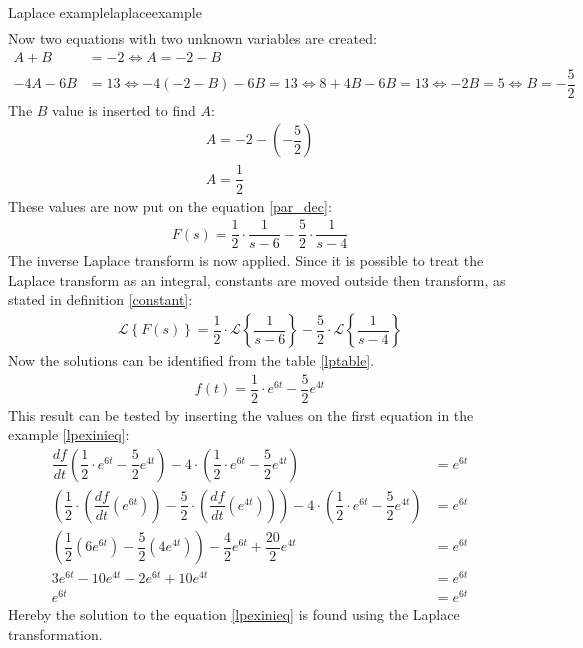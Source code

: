 \begin{example}{Laplace example}{laplaceexample}
\begin{align*}
\end{align*}
Now two equations with two unknown variables are created:
\begin{align*}
A+B &=-2 \Leftrightarrow A=-2-B \\
-4A-6B &=13 \Leftrightarrow -4(-2-B)-6B = 13 \Leftrightarrow 8 + 4B - 6B = 13 \Leftrightarrow -2B = 5 \Leftrightarrow B = -\dfrac{5}{2}
\end{align*}
The $B$ value is inserted to find $A$:
\begin{align*}
A=-2- \left(-\dfrac{5}{2} \right) \\
A=\dfrac{1}{2}
\end{align*}
These values are now put on the equation \eqref{par_dec}:
\begin{align*}
F(s) = \dfrac{1}{2} \cdot \dfrac{1}{s-6} - \dfrac{5}{2} \cdot \dfrac{1}{s-4}
\end{align*}
The inverse Laplace transform is now applied. Since it is possible to treat the Laplace transform as an integral, constants are moved outside then transform, as stated in definition \ref{constant}:
\begin{align*}
\mathcal{L} \left\{F(s) \right\} = \dfrac{1}{2} \cdot \mathcal{L} \left\{\dfrac{1}{s-6} \right\} - \dfrac{5}{2} \cdot \mathcal{L} \left\{\dfrac{1}{s-4} \right\}
\end{align*}
Now the solutions can be identified from the table \ref{lptable}.
\begin{align*}
f(t) = \dfrac{1}{2} \cdot e^{6t} - \dfrac{5}{2}e^{4t}
\end{align*}
This result can be tested by inserting the values on the first equation in the example \eqref{lpexinieq}:
\begin{align*}
\dfrac{df}{dt} \left(\dfrac{1}{2} \cdot e^{6t} - \dfrac{5}{2}e^{4t} \right) - 4 \cdot \left(\dfrac{1}{2} \cdot e^{6t} - \dfrac{5}{2}e^{4t} \right) &= e^{6t} \\
\left(\dfrac{1}{2} \cdot \left(\dfrac{df}{dt} \left(e^{6t} \right) \right) - \dfrac{5}{2} \cdot \left(\dfrac{df}{dt} \left(e^{4t} \right) \right) \right) - 4 \cdot \left(\dfrac{1}{2} \cdot e^{6t} - \dfrac{5}{2} e^{4t} \right) &= e^{6t} \\
\left(\dfrac{1}{2} \left(6e^{6t} \right) - \dfrac{5}{2} \left(4e^{4t} \right) \right) - \dfrac{4}{2}e^{6t}+\dfrac{20}{2}e^{4t}&= e^{6t}\\
3e^{6t}-10e^{4t}-2e^{6t}+10e^{4t} &= e^{6t} \\
e^{6t} &= e^{6t}
\end{align*}
Hereby the solution to the equation \eqref{lpexinieq} is found using the Laplace transformation.
\end{example}